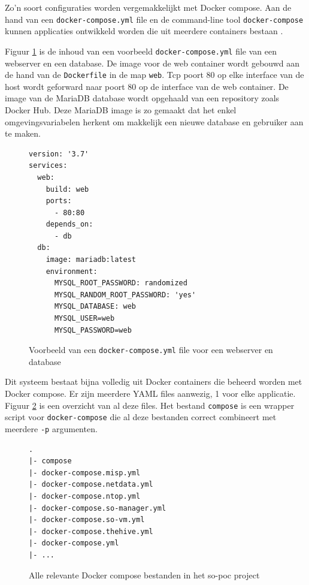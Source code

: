 \documentclass[a4paper, 12pt]{report}
\begin{document}
Zo'n soort configuraties worden vergemakkelijkt met Docker compose.
Aan de hand van een \lstinline|docker-compose.yml| file en de command-line tool \lstinline|docker-compose| kunnen applicaties ontwikkeld worden die uit meerdere containers bestaan \autocite{docker:compose}.

Figuur \ref{fig:compose-web-example} is de inhoud van een voorbeeld \lstinline|docker-compose.yml| file van een webserver en een database.
De image voor de web container wordt gebouwd aan de hand van de \lstinline|Dockerfile| in de map \lstinline|web|.
Tcp poort 80 op elke interface van de host wordt geforward naar poort 80 op de interface van de web container.
De image van de MariaDB database wordt opgehaald van een repository zoals Docker Hub.
Deze MariaDB image is zo gemaakt dat het enkel omgevingsvariabelen herkent om makkelijk een nieuwe database en gebruiker aan te maken.

\begin{figure}[H]
  \begin{lstlisting}
version: '3.7'
services:
  web:
    build: web
    ports:
      - 80:80
    depends_on:
      - db
  db:
    image: mariadb:latest
    environment:
      MYSQL_ROOT_PASSWORD: randomized
      MYSQL_RANDOM_ROOT_PASSWORD: 'yes'
      MYSQL_DATABASE: web
      MYSQL_USER=web
      MYSQL_PASSWORD=web
  \end{lstlisting}
  \caption{Voorbeeld van een \lstinline|docker-compose.yml| file voor een webserver en database}
  \label{fig:compose-web-example}
\end{figure}

Dit systeem bestaat bijna volledig uit Docker containers die beheerd worden met Docker compose.
Er zijn meerdere YAML files aanwezig, 1 voor elke applicatie.
Figuur \ref{fig:compose-so-poc-files} is een overzicht van al deze files.
Het bestand \lstinline|compose| is een wrapper script voor \lstinline{docker-compose} die al deze bestanden correct combineert met meerdere \lstinline|-p| argumenten.

\begin{figure}[H]
  \begin{lstlisting}
.
|- compose
|- docker-compose.misp.yml
|- docker-compose.netdata.yml
|- docker-compose.ntop.yml
|- docker-compose.so-manager.yml
|- docker-compose.so-vm.yml
|- docker-compose.thehive.yml
|- docker-compose.yml
|- ...
  \end{lstlisting}
  \caption{Alle relevante Docker compose bestanden in het so-poc project}
  \label{fig:compose-so-poc-files}
\end{figure}
\end{document}
